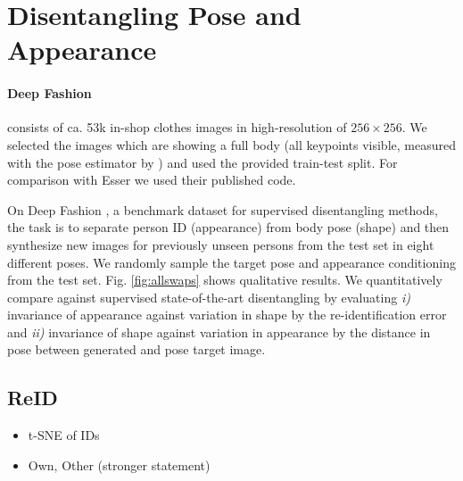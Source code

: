 
	\section{Disentangling Pose and Appearance}

	\paragraph{Deep Fashion} \cite{liu16deepfashion, liu16deepfashionwild} consists of ca. 53k in-shop clothes images in high-resolution of $256 \times 256$. We selected the images which are showing a full body (all keypoints visible, measured with the pose estimator by \cite{cao17affinityfield}) and used the provided train-test split. For comparison with Esser \etal \cite{esser18} we used their published code.


	On Deep Fashion \cite{liu16deepfashion, liu16deepfashionwild}, a benchmark dataset for supervised disentangling methods, the task is to separate person ID (appearance) from body pose (shape) and then synthesize new images for previously unseen persons from the test set in eight different poses. We randomly sample the target pose and appearance conditioning from the test set. Fig. \ref{fig:allswaps} shows qualitative results.
	We quantitatively compare against supervised state-of-the-art disentangling \cite{esser18} by evaluating \emph{i)} invariance of appearance against variation in shape by the re-identification error and \emph{ii)} invariance of shape against variation in appearance by the distance in pose between generated and pose target image.

	\subsection{ReID}
	\begin{itemize}
		\item t-SNE of IDs
		\item Own, Other (stronger statement)
	\end{itemize}

